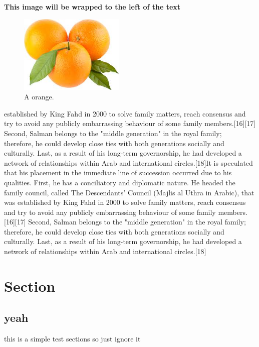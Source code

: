 \documentclass[12pt]{article}
\begin{document}
\textbf{This image will be wrapped to the left of the text}


\begin{figure}
\centering
  \includegraphics[width=5cm]{oranges.png}
  \caption{A orange.}
  \label{fig:a orange}
  \end{figure}


 established by King Fahd in 2000 to solve family matters, reach consensus and try to avoid any publicly embarrassing behaviour of some family members.[16][17] Second, Salman belongs to the "middle generation" in the royal family; \\therefore, he could develop close ties with both generations socially and culturally. Last, as a result of his long-term governorship, he had developed a network of relationships within Arab and international circles.[18]It is speculated that his placement in the immediate line of succession occurred due to his qualities. First, he has a conciliatory and diplomatic nature. He headed the family council, called The Descendants' Council (Majlis al Uthra in Arabic), that was established by King Fahd in 2000 to solve family matters, reach consensus and try to avoid any publicly embarrassing behaviour of some family members.[16][17] Second, Salman belongs to the "middle generation" in the royal family; therefore, he could develop close ties with both generations socially and culturally. Last, as a result of his long-term governorship, he had developed a network of relationships within Arab and international circles.[18]
 
\section{Section }
\subsection{yeah}
this is a simple test sections so just ignore it 
 
 
\end{document}
